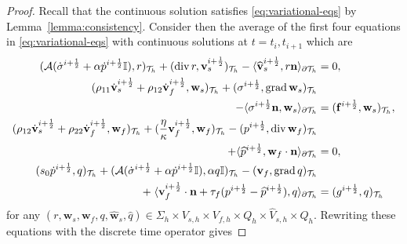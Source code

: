 \documentclass[10pt,letterpaper]{amsart}
\theoremstyle{plain} %
\theoremstyle{remark} %
\newcommand{\vect}[1]{\mathbf{#1}}
\newcommand{\divergence}{\mathrm{div}\,}
\newcommand{\grad}{\mathrm{grad}\,}
\newcommand{\Id}{\mathbb{I}} %
\newcommand{\Ael}{\mathcal{A}} %
\newcommand{\Thprod}[2]{( #1, #2 )_{\mathcal{T}_h}}
\newcommand{\pThprod}[2]{\langle #1, #2 \rangle_{\partial \mathcal{T}_{h}}}
\begin{document}
\begin{proof}
Recall that the continuous solution satisfies \eqref{eq:variational-eqs} by Lemma~\ref{lemma:consistency}. Consider then the average of the first four equations in \eqref{eq:variational-eqs} with continuous solutions at $t= t_{i}, t_{i+1}$ which are
%
{
		\begin{align*}
			\Thprod{\Ael(\dot{\sigma}^{i+\frac 12} + \alpha \dot{p}^{i+\frac 12} \Id)}{r} +\Thprod{\divergence r}{\vect{v}_{s}^{i+\frac 12}} -\pThprod{\widehat{\vect{v}}_{s}^{i+\frac 12}}{r \vect{n}} &= 0 ,
			\\ 
			\Thprod{\rho_{11}\dot{\vect{v}}_{s}^{i+\frac 12} + \rho_{12}\dot{\vect{v}}_{f}^{i+\frac 12}}{\vect{w}_{s}} + \Thprod{\sigma^{i+\frac 12}}{\grad \vect{w}_{s}} &
            \\
            \notag 
            - \pThprod{{\sigma^{i+\frac 12} \vect{n}}}{\vect{w}_{s}} & = \Thprod{\vect{f}^{i+\frac 12}}{\vect{w}_{s}}, 
			\\
			\Thprod{\rho_{12}\dot{\vect{v}}_{s}^{i+\frac 12}+\rho_{22}\dot{\vect{v}}_{f}^{i+\frac 12}}{\vect{w}_{f}} + \Thprod{\frac{\eta}{\kappa} \vect{v}_{f}^{i+\frac 12}}{\vect{w}_{f}} - \Thprod{p^{i+\frac 12} }{\divergence\vect{w}_{f}} &
            \\
            \notag 
            +\pThprod{\widehat{p}^{i+\frac 12}}{\vect{w}_{f}\cdot\vect{n}} & = 0, 
			\\
			\Thprod{s_{0}\dot{p}^{i+\frac 12}}{q} + \Thprod{\Ael(\dot{\sigma}^{i+\frac 12}+\alpha \dot{p}^{i+\frac 12}\Id)}{\alpha q\Id} - \Thprod{\vect{v}_{f}}{\grad q} &\\
			+\; \pThprod{\vect{v}_{f}^{i+\frac 12}\cdot \vect{n} + \tau_f(p^{i+\frac 12} - \widehat{p}^{i+\frac 12})}{q} & = \Thprod{g^{i+\frac 12}}{q}
		\end{align*}
}
%
for any $(r, \vect{w}_s, \vect{w}_f, q, \widehat{\vect{w}}_s, \widehat{q}) \in \Sigma_{h} \times V_{s,h} \times V_{f,h} \times Q_{h} \times \widehat{V}_{s,h}\times \widehat{Q}_{h}$. Rewriting these equations with the discrete time operator gives

\end{proof}
\end{document}

